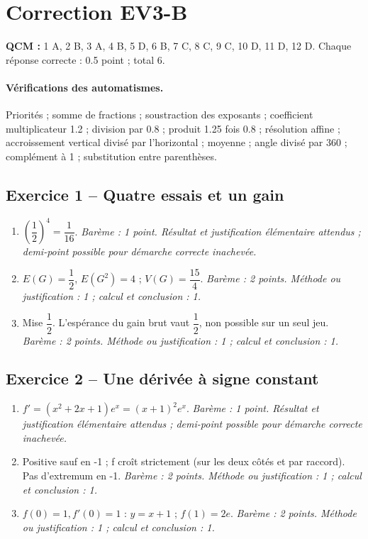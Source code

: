 \mxnewpage\section*{Correction EV3-B}\label{EV3-B-CORR}
\textbf{QCM :} 1 A, 2 B, 3 A, 4 B, 5 D, 6 B, 7 C, 8 C, 9 C, 10 D, 11 D, 12 D. Chaque réponse correcte : \num{0,5} point ; total 6.
\paragraph{Vérifications des automatismes.} Priorités ; somme de fractions ; soustraction des exposants ; coefficient multiplicateur \num{1,2} ; division par \num{0,8} ; produit \num{1,25} fois \num{0,8} ; résolution affine ; accroissement vertical divisé par l’horizontal ; moyenne ; angle divisé par 360 ; complément à 1 ; substitution entre parenthèses.
\subsection*{Exercice 1 -- Quatre essais et un gain}
\begin{enumerate}
\item $(\dfrac{1}{2})^4=\dfrac{1}{16}$. \textit{Barème : 1 point. Résultat et justification élémentaire attendus ; demi-point possible pour démarche correcte inachevée.}
\item $E(G)=\dfrac{1}{2}$, $E(G^2)=4$ ; $V(G)=\dfrac{15}{4}$. \textit{Barème : 2 points. Méthode ou justification : 1 ; calcul et conclusion : 1.}
\item Mise $\dfrac{1}{2}$. L’espérance du gain brut vaut $\dfrac{1}{2}$, non possible sur un seul jeu. \textit{Barème : 2 points. Méthode ou justification : 1 ; calcul et conclusion : 1.}
\end{enumerate}
\subsection*{Exercice 2 -- Une dérivée à signe constant}
\begin{enumerate}
\item $f\prime=(x^2+2x+1)e^x=(x+1)^2e^x$. \textit{Barème : 1 point. Résultat et justification élémentaire attendus ; demi-point possible pour démarche correcte inachevée.}
\item Positive sauf en -1 ; f croît strictement (sur les deux côtés et par raccord). Pas d’extremum en -1. \textit{Barème : 2 points. Méthode ou justification : 1 ; calcul et conclusion : 1.}
\item $f(0)=1,f\prime(0)=1$ : $y=x+1$ ; $f(1)=2e$. \textit{Barème : 2 points. Méthode ou justification : 1 ; calcul et conclusion : 1.}
\end{enumerate}
